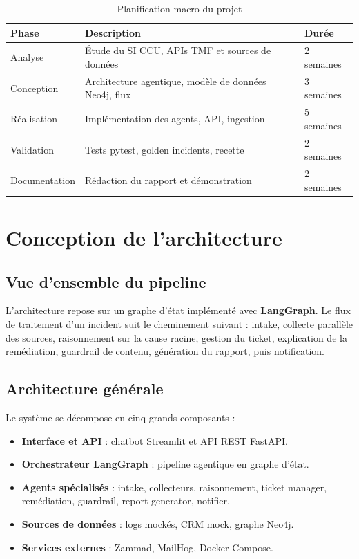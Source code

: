 \begin{table}[H]
    \centering
    \renewcommand{\arraystretch}{1.3}
    \begin{tabular}{|l|p{8cm}|l|}
        \hline
        \rowcolor{iNavy} \textbf{\color{white}Phase} & \textbf{\color{white}Description} & \textbf{\color{white}Durée} \\ \hline
        Analyse & Étude du SI CCU, APIs TMF et sources de données & 2 semaines \\ \hline
        Conception & Architecture agentique, modèle de données Neo4j, flux & 3 semaines \\ \hline
        Réalisation & Implémentation des agents, API, ingestion & 5 semaines \\ \hline
        Validation & Tests pytest, golden incidents, recette & 2 semaines \\ \hline
        Documentation & Rédaction du rapport et démonstration & 2 semaines \\ \hline
    \end{tabular}
    \caption{Planification macro du projet}
    \label{tab:planning}
\end{table}

\section{Conception de l'architecture}

\subsection{Vue d'ensemble du pipeline}
L'architecture repose sur un graphe d'état implémenté avec \textbf{LangGraph}. Le flux de traitement d'un incident suit le cheminement suivant : intake, collecte parallèle des sources, raisonnement sur la cause racine, gestion du ticket, explication de la remédiation, guardrail de contenu, génération du rapport, puis notification.

\subsection{Architecture générale}
Le système se décompose en cinq grands composants :

\begin{itemize}
    \setlength\itemsep{0.1em}
    \setlength\parskip{0pt}
    \setlength\parsep{0pt}
    \item \textbf{Interface et API} : chatbot Streamlit et API REST FastAPI.
    \item \textbf{Orchestrateur LangGraph} : pipeline agentique en graphe d'état.
    \item \textbf{Agents spécialisés} : intake, collecteurs, raisonnement, ticket manager, remédiation, guardrail, report generator, notifier.
    \item \textbf{Sources de données} : logs mockés, CRM mock, graphe Neo4j.
    \item \textbf{Services externes} : Zammad, MailHog, Docker Compose.
\end{itemize}

